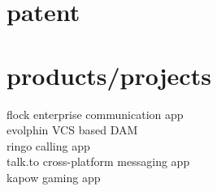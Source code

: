 \begin{minipage}[t]{0.32\textwidth}
\sectionspace %


\section{patent}
\sectionspace %


\section{products/projects}
flock enterprise communication app \href{https://flock.com}{\faChain} \\
evolphin VCS based DAM \href{https://evolphin.com/}{\faChain} \\
ringo calling app \href{https://www.ringo.co/}{\faChain}\\
talk.to cross-platform messaging app \\
kapow gaming app \\

\end{minipage} %
\hspace{.01\textwidth}
%
%
